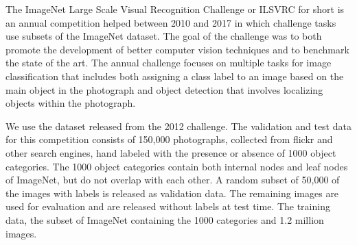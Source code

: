 The ImageNet Large Scale Visual Recognition Challenge or ILSVRC for short is an 
annual competition helped between 2010 and 2017 in which challenge tasks use 
subsets of the ImageNet dataset.  The goal of the challenge was to both promote 
the development of better computer vision techniques and to benchmark the state 
of the art.
The annual challenge focuses on multiple tasks for image classification that 
includes both assigning a class label to an image based on the main object in 
the photograph and object detection that involves localizing objects within 
the photograph.

We use the dataset released from the 2012 challenge.  The validation and test 
data for this competition consists of 150,000 photographs, collected from flickr 
and other search engines, hand labeled with the presence or absence of 1000 
object categories. The 1000 object categories contain both internal nodes and 
leaf nodes of ImageNet, but do not overlap with each other. A random subset of 
50,000 of the images with labels is released as validation data. The remaining 
images are used for evaluation and are released without labels at test time.  
The training data, the subset of ImageNet containing the 1000 categories and 1.2 
million images. 

